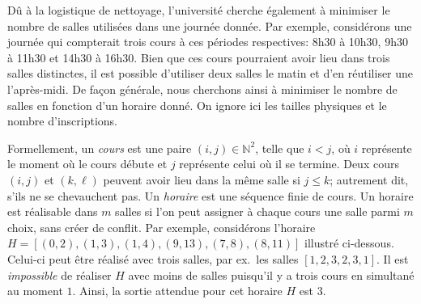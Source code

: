 \documentclass{article}
\newcommand{\N}{\mathbb{N}}                      %
\begin{document}
\pagebreak


\begin{question}\medskip
  Dû à la logistique de nettoyage, l'université cherche également à
  minimiser le nombre de salles utilisées dans une journée donnée. Par
  exemple, considérons une journée qui compterait trois cours à ces
  périodes respectives: 8h30 à 10h30, 9h30 à 11h30 et 14h30 à
  16h30. Bien que ces cours pourraient avoir lieu dans trois salles
  distinctes, il est possible d'utiliser deux salles le matin et d'en
  réutiliser une l'après-midi. De façon générale, nous cherchons ainsi
  à minimiser le nombre de salles en fonction d'un horaire donné. On
  ignore ici les tailles physiques et le nombre d'inscriptions.

  Formellement, un \emph{cours} est une paire $(i, j) \in \N^2$, telle
  que $i < j$, où $i$ représente le moment où le cours débute et $j$
  représente celui où il se termine. Deux cours $(i, j)$ et $(k,
  \ell)$ peuvent avoir lieu dans la même salle si $j \leq k$;
  autrement dit, s'ils ne se chevauchent pas. Un \emph{horaire} est
  une séquence finie de cours. Un horaire est réalisable dans $m$
  salles si l'on peut assigner à chaque cours une salle parmi $m$
  choix, sans créer de conflit. Par exemple, considérons l'horaire $H
  = [(0, 2), (1, 3), (1, 4), (9, 13), (7, 8), (8, 11)]$ illustré
  ci-dessous. Celui-ci peut être réalisé avec trois salles, par
  ex.\ les salles $[1, 2, 3, 2, 3, 1]$. Il est \emph{impossible} de
  réaliser $H$ avec moins de salles puisqu'il y a trois cours en
  simultané au moment $1$. Ainsi, la sortie attendue pour cet horaire
  $H$ est $3$.

  \begin{center}
  \end{center}  


\end{question}
\end{document}
